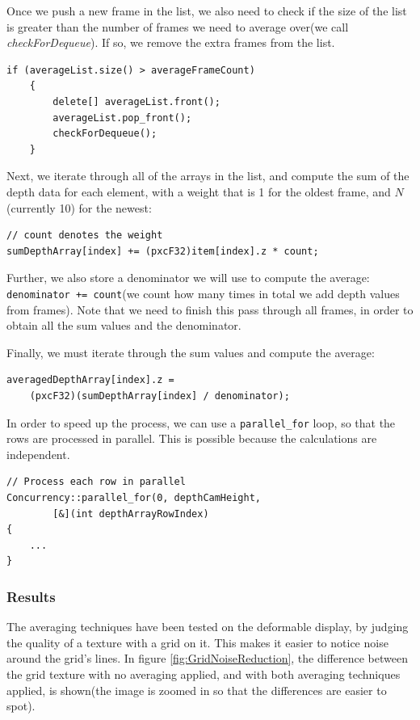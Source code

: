 \documentclass[]{article}
\begin{document}
Once we push a new frame in the list, we also need to check if the size of the list is greater than the number of frames we need to average over(we call \textit{checkForDequeue}). If so, we remove the extra frames from the list.
\begin{verbatim}
if (averageList.size() > averageFrameCount)
	{
		delete[] averageList.front();
		averageList.pop_front();
		checkForDequeue();
	}
\end{verbatim}

Next, we iterate through all of the arrays in the list, and compute the sum of the depth data for each element, with a weight that is 1 for the oldest frame, and $N$(currently 10) for the newest:
\begin{verbatim}
// count denotes the weight
sumDepthArray[index] += (pxcF32)item[index].z * count;
\end{verbatim}

Further, we also store a denominator we will use to compute the average: \verb|denominator += count|(we count how many times in total we add depth values from frames). Note that we need to finish this pass through all frames, in order to obtain all the sum values and the denominator.

Finally, we must iterate through the sum values and compute the average:
\begin{verbatim}
averagedDepthArray[index].z = 
	(pxcF32)(sumDepthArray[index] / denominator);
\end{verbatim}

In order to speed up the process, we can use a \verb|parallel_for| loop, so that the rows are processed in parallel. This is possible because the calculations are independent.
\begin{verbatim}
// Process each row in parallel
Concurrency::parallel_for(0, depthCamHeight,
		[&](int depthArrayRowIndex)
{
	...
}
\end{verbatim}

\subsubsection{Results}

The averaging techniques have been tested on the deformable display, by judging the quality of a texture with a grid on it. This makes it easier to notice noise around the grid's lines. In figure \ref{fig:GridNoiseReduction}, the difference between the grid texture with no averaging applied, and with both averaging techniques applied, is shown(the image is zoomed in so that the differences are easier to spot).
\end{document}
